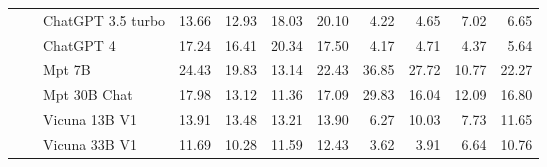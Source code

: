 \begin{table}[!htbp]
\begin{tabular}{l|l|l|rrrr|rrrr}
 &  & ChatGPT 3.5 turbo & {\cellcolor[HTML]{FDDEDB}} \color[HTML]{000000} 13.66 & {\cellcolor[HTML]{FDE1DE}} \color[HTML]{000000} 12.93 & {\cellcolor[HTML]{FCCECA}} \color[HTML]{000000} 18.03 & {\cellcolor[HTML]{FCC6C2}} \color[HTML]{000000} 20.10 & {\cellcolor[HTML]{F6FCFD}} \color[HTML]{000000} 4.22 & {\cellcolor[HTML]{F5FBFD}} \color[HTML]{000000} 4.65 & {\cellcolor[HTML]{F1FAFC}} \color[HTML]{000000} 7.02 & {\cellcolor[HTML]{F2FAFC}} \color[HTML]{000000} 6.65 \\
 &  & ChatGPT 4 & {\cellcolor[HTML]{FCD1CD}} \color[HTML]{000000} 17.24 & {\cellcolor[HTML]{FDD4D0}} \color[HTML]{000000} 16.41 & {\cellcolor[HTML]{FCC6C1}} \color[HTML]{000000} 20.34 & {\cellcolor[HTML]{FCD0CC}} \color[HTML]{000000} 17.50 & {\cellcolor[HTML]{F6FCFD}} \color[HTML]{000000} 4.17 & {\cellcolor[HTML]{F5FBFD}} \color[HTML]{000000} 4.71 & {\cellcolor[HTML]{F6FCFD}} \color[HTML]{000000} 4.37 & {\cellcolor[HTML]{F4FBFC}} \color[HTML]{000000} 5.64 \\
 &  & Mpt 7B & {\cellcolor[HTML]{FBB0BA}} \color[HTML]{000000} 24.43 & {\cellcolor[HTML]{FCC7C3}} \color[HTML]{000000} 19.83 & {\cellcolor[HTML]{FDE1DE}} \color[HTML]{000000} 13.14 & {\cellcolor[HTML]{FBBABD}} \color[HTML]{000000} 22.43 & {\cellcolor[HTML]{8DD3C0}} \color[HTML]{000000} 36.85 & {\cellcolor[HTML]{BAE5DC}} \color[HTML]{000000} 27.72 & {\cellcolor[HTML]{EBF7FA}} \color[HTML]{000000} 10.77 & {\cellcolor[HTML]{D1EEE9}} \color[HTML]{000000} 22.27 \\
 &  & Mpt 30B Chat & {\cellcolor[HTML]{FCCECA}} \color[HTML]{000000} 17.98 & {\cellcolor[HTML]{FDE1DE}} \color[HTML]{000000} 13.12 & {\cellcolor[HTML]{FDE6E2}} \color[HTML]{000000} 11.36 & {\cellcolor[HTML]{FCD1CD}} \color[HTML]{000000} 17.09 & {\cellcolor[HTML]{B0E1D6}} \color[HTML]{000000} 29.83 & {\cellcolor[HTML]{E0F3F5}} \color[HTML]{000000} 16.04 & {\cellcolor[HTML]{E8F6FA}} \color[HTML]{000000} 12.09 & {\cellcolor[HTML]{DEF2F4}} \color[HTML]{000000} 16.80 \\
 &  & Vicuna 13B V1 & {\cellcolor[HTML]{FDDDDA}} \color[HTML]{000000} 13.91 & {\cellcolor[HTML]{FDDFDC}} \color[HTML]{000000} 13.48 & {\cellcolor[HTML]{FDE0DD}} \color[HTML]{000000} 13.21 & {\cellcolor[HTML]{FDDDDA}} \color[HTML]{000000} 13.90 & {\cellcolor[HTML]{F2FAFC}} \color[HTML]{000000} 6.27 & {\cellcolor[HTML]{ECF8FA}} \color[HTML]{000000} 10.03 & {\cellcolor[HTML]{F0F9FB}} \color[HTML]{000000} 7.73 & {\cellcolor[HTML]{E9F7FA}} \color[HTML]{000000} 11.65 \\
 &  & Vicuna 33B V1 & {\cellcolor[HTML]{FDE5E2}} \color[HTML]{000000} 11.69 & {\cellcolor[HTML]{FEE9E6}} \color[HTML]{000000} 10.28 & {\cellcolor[HTML]{FDE5E2}} \color[HTML]{000000} 11.59 & {\cellcolor[HTML]{FDE3E0}} \color[HTML]{000000} 12.43 & {\cellcolor[HTML]{F7FCFD}} \color[HTML]{000000} 3.62 & {\cellcolor[HTML]{F7FCFD}} \color[HTML]{000000} 3.91 & {\cellcolor[HTML]{F2FAFC}} \color[HTML]{000000} 6.64 & {\cellcolor[HTML]{EBF7FA}} \color[HTML]{000000} 10.76 \\

\end{tabular}
\end{table}
